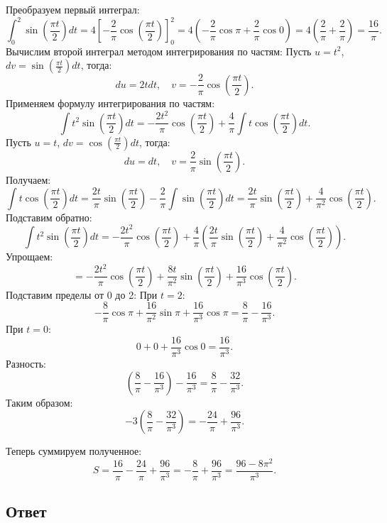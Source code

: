 \documentclass{article}
\begin{document}
Преобразуем первый интеграл:
\[
\int_{0}^{2} \sin\left(\frac{\pi t}{2}\right) dt = 4\left[-\frac{2}{\pi} \cos\left(\frac{\pi t}{2}\right)\right]_0^2 = 4\left(-\frac{2}{\pi} \cos\pi + \frac{2}{\pi} \cos 0\right) = 4\left(\frac{2}{\pi} + \frac{2}{\pi}\right) = \frac{16}{\pi}.
\]
 Вычислим второй интеграл методом интегрирования по частям:
Пусть \(u = t^2\), \(dv = \sin\left(\frac{\pi t}{2}\right) dt\), тогда:
\[
du = 2t dt, \quad v = -\frac{2}{\pi} \cos\left(\frac{\pi t}{2}\right).
\]
Применяем формулу интегрирования по частям:
\[
\int t^2 \sin\left(\frac{\pi t}{2}\right) dt = -\frac{2t^2}{\pi} \cos\left(\frac{\pi t}{2}\right) + \frac{4}{\pi} \int t \cos\left(\frac{\pi t}{2}\right) dt.
\]
Пусть \(u = t\), \(dv = \cos\left(\frac{\pi t}{2}\right) dt\), тогда:
\[
du = dt, \quad v = \frac{2}{\pi} \sin\left(\frac{\pi t}{2}\right).
\]
Получаем:
\[
\int t \cos\left(\frac{\pi t}{2}\right) dt = \frac{2t}{\pi} \sin\left(\frac{\pi t}{2}\right) - \frac{2}{\pi} \int \sin\left(\frac{\pi t}{2}\right) dt = \frac{2t}{\pi} \sin\left(\frac{\pi t}{2}\right) + \frac{4}{\pi^2} \cos\left(\frac{\pi t}{2}\right).
\]
Подставим обратно:
\[
\int t^2 \sin\left(\frac{\pi t}{2}\right) dt = -\frac{2t^2}{\pi} \cos\left(\frac{\pi t}{2}\right) + \frac{4}{\pi} \left(\frac{2t}{\pi} \sin\left(\frac{\pi t}{2}\right) + \frac{4}{\pi^2} \cos\left(\frac{\pi t}{2}\right)\right).
\]
Упрощаем:
\[
= -\frac{2t^2}{\pi} \cos\left(\frac{\pi t}{2}\right) + \frac{8t}{\pi^2} \sin\left(\frac{\pi t}{2}\right) + \frac{16}{\pi^3} \cos\left(\frac{\pi t}{2}\right).
\]
Подставим пределы от 0 до 2:
При \(t = 2\):
\[
-\frac{8}{\pi} \cos\pi + \frac{16}{\pi^2} \sin\pi + \frac{16}{\pi^3} \cos\pi = \frac{8}{\pi} - \frac{16}{\pi^3}.
\]
При \(t = 0\):
\[
0 + 0 + \frac{16}{\pi^3} \cos 0 = \frac{16}{\pi^3}.
\]
Разность:
\[
\left(\frac{8}{\pi} - \frac{16}{\pi^3}\right) - \frac{16}{\pi^3} = \frac{8}{\pi} - \frac{32}{\pi^3}.
\]
Таким образом:
\[
-3 \left(\frac{8}{\pi} - \frac{32}{\pi^3}\right) = -\frac{24}{\pi} + \frac{96}{\pi^3}.
\]

Теперь суммируем полученное:
\[
S = \frac{16}{\pi} - \frac{24}{\pi} + \frac{96}{\pi^3} = -\frac{8}{\pi} + \frac{96}{\pi^3} = \frac{96 - 8\pi^2}{\pi^3}.
\]
\subsection*{Ответ}
\end{document}
